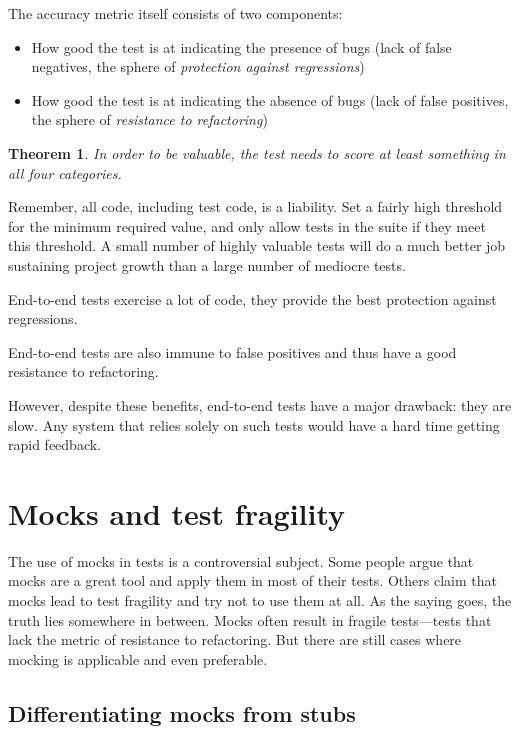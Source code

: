 \documentclass{article}
\newtheorem{theorem}{Theorem}
\begin{document}
The accuracy metric itself consists of two components:

\begin{itemize}
	\item How good the test is at indicating the presence of bugs (lack of false negatives, the sphere of \textit{protection against regressions}) 
	\item How good the test is at indicating the absence of bugs (lack of false positives, the sphere of \textit{resistance to refactoring})
\end{itemize}	

\begin{theorem}
In order to be valuable, the test needs to score at least something in all four categories.
\end{theorem}

Remember, all code, including test code, is a liability. Set a fairly high threshold for the minimum required value, and only allow tests in the suite if they meet this threshold. A small number of highly valuable tests will do a much better job sustaining project growth than a large number of mediocre tests.

End-to-end tests exercise a lot of code, they provide the best protection against regressions.

End-to-end tests are also immune to false positives and thus have a good resistance to refactoring.

However, despite these benefits, end-to-end tests have a major drawback: they are slow. Any system that relies solely on such tests would have a hard time getting rapid feedback. 

\section{Mocks and test fragility}

The use of mocks in tests is a controversial subject. Some people argue that mocks are a great tool and apply them in most of their tests. Others claim that mocks lead to test fragility and try not to use them at all. As the saying goes, the truth lies somewhere in between. Mocks often result in fragile tests—tests that lack the metric of resistance to refactoring. But there are still cases where mocking is applicable and even preferable.

\subsection{Differentiating mocks from stubs}
\end{document}
